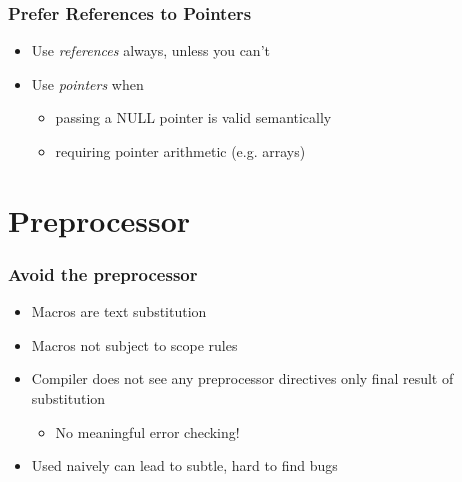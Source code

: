 \documentclass[table]{beamer}
\newcounter{rulecount}
\newcommand{\declarerule}{\textbf{\color{themeblue}{Rule \therulecount:}} }
\begin{document}
\begin{frame}
    \frametitle{\declarerule Prefer References to Pointers}
    \fontsize{12pt}{14}\selectfont
    \begin{itemize}
        \item Use \emph{references} always, unless you can't
        \item Use \emph{pointers} when
            \begin{itemize}
    \fontsize{10pt}{11}\selectfont
                \item passing a NULL pointer is valid semantically
                \item requiring pointer arithmetic (e.g. arrays)
            \end{itemize}
    \end{itemize}
\end{frame}



\section{Preprocessor}
\frame{\sectionpage}

\begin{frame}
    \frametitle{\declarerule Avoid the preprocessor}
    \begin{itemize}
        \item Macros are text substitution
        \item Macros not subject to scope rules
        \item Compiler does not see any preprocessor directives only final result of substitution
            \begin{itemize}
                \item No meaningful error checking!
            \end{itemize}
        \item Used naively can lead to subtle, hard to find bugs
    \end{itemize}
\end{frame}
\end{document}
